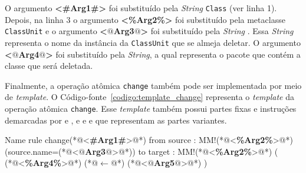 O argumento \textbf{<\#Arg1\#>} foi substituído pela \textit{String} \texttt{Class} (ver linha 1). Depois, na linha 3 o argumento \textbf{<\%Arg2\%>} foi substituído pela metaclasse \texttt{ClassUnit} e o argumento \textbf{<$@$Arg3$@$>} foi substituído pela \textit{String} \texttt{}. Essa \textit{String} representa o nome da instância da \texttt{ClassUnit} que se almeja deletar. O argumento \textbf{<$@$Arg4$@$>} foi substituído pela \textit{String}\texttt{}, a qual representa o pacote que contém a classe que será deletada.


Finalmente, a operação atômica \texttt{change} também pode ser implementada por meio de \textit{template}. O Código-fonte~\ref{codigo:template_change} representa o \textit{template} da operação atômica \texttt{change}. Esse \textit{template} também possui partes fixas e instruções demarcadas por \aspas{\textbf{<\#}} e \aspas{\textbf{\#>}}, \aspas{\textbf{<\%}} e \aspas{\textbf{\%>}} e  e  que representam as partes variantes.

\begin{codigo}[caption={[\textit{Template} para realizar a operação atômica \texttt{change}.] \textit{Template} para realizar a operação atômica \texttt{change}.},escapeinside={(*@}{@*)}, basicstyle=\footnotesize, label={codigo:template_change}, language=ATL]{Name}
rule change(*@<\textbf{\#Arg1\#}>@*) {
	from
		source : MM!(*@<\textbf{\%Arg2\%}>@*) (source.name=(*@<\textbf{$@$Arg3$@$}>@*))
	to 
		target : MM!(*@<\textbf{\%Arg2\%}>@*) (
			(*@<\textbf{\%Arg4\%}>@*) (*@$\leftarrow$@*) (*@<\textbf{$@$Arg5$@$}>@*)
		)
}
\end{codigo}

